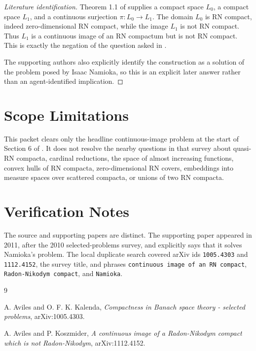 \documentclass[11pt]{article}
\begin{document}
\begin{proof}[Literature identification]
Theorem 1.1 of \cite{AvKos} supplies a compact space \(L_0\), a compact space
\(L_1\), and a continuous surjection \(\pi:L_0\to L_1\). The domain \(L_0\) is
RN compact, indeed zero-dimensional RN compact, while the image \(L_1\) is not
RN compact. Thus \(L_1\) is a continuous image of an RN compactum but is not RN
compact. This is exactly the negation of the question asked in \cite{AK}.

The supporting authors also explicitly identify the construction as a solution
of the problem posed by Isaac Namioka, so this is an explicit later answer
rather than an agent-identified implication.
\end{proof}

\section*{Scope Limitations}

This packet clears only the headline continuous-image problem at the start of
Section 6 of \cite{AK}. It does not resolve the nearby questions in that survey
about quasi-RN compacta, cardinal reductions, the space of almost increasing
functions, convex hulls of RN compacta, zero-dimensional RN covers, embeddings
into measure spaces over scattered compacta, or unions of two RN compacta.

\section*{Verification Notes}

The source and supporting papers are distinct. The supporting paper appeared in
2011, after the 2010 selected-problems survey, and explicitly says that it solves
Namioka's problem. The local duplicate search covered arXiv ids
\texttt{1005.4303} and \texttt{1112.4152}, the survey title, and phrases
\texttt{continuous image of an RN compact}, \texttt{Radon-Nikodym compact}, and
\texttt{Namioka}.

\begin{thebibliography}{9}

A. Aviles and O. F. K. Kalenda,
\emph{Compactness in Banach space theory - selected problems},
arXiv:1005.4303.

A. Aviles and P. Koszmider,
\emph{A continuous image of a Radon-Nikodym compact which is not
Radon-Nikodym},
arXiv:1112.4152.

\end{thebibliography}
\end{document}
